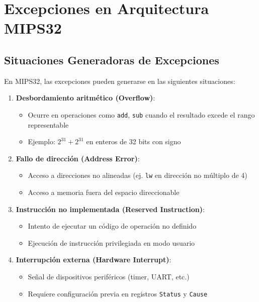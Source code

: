 \documentclass{article}
\begin{document}
\section{Excepciones en Arquitectura MIPS32}
\subsection{Situaciones Generadoras de Excepciones}

En MIPS32, las excepciones pueden generarse en las siguientes situaciones:

\begin{enumerate}
    \item \textbf{Desbordamiento aritmético (Overflow)}:
    \begin{itemize}
        \item Ocurre en operaciones como \texttt{add}, \texttt{sub} cuando el resultado excede el rango representable
        \item Ejemplo: $2^{31} + 2^{31}$ en enteros de 32 bits con signo
    \end{itemize}

    \item \textbf{Fallo de dirección (Address Error)}:
    \begin{itemize}
        \item Acceso a direcciones no alineadas (ej. \texttt{lw} en dirección no múltiplo de 4)
        \item Acceso a memoria fuera del espacio direccionable
    \end{itemize}

    \item \textbf{Instrucción no implementada (Reserved Instruction)}:
    \begin{itemize}
        \item Intento de ejecutar un código de operación no definido
        \item Ejecución de instrucción privilegiada en modo usuario
    \end{itemize}

    \item \textbf{Interrupción externa (Hardware Interrupt)}:
    \begin{itemize}
        \item Señal de dispositivos periféricos (timer, UART, etc.)
        \item Requiere configuración previa en registros \texttt{Status} y \texttt{Cause}
    \end{itemize}


\end{enumerate}
\end{document}
